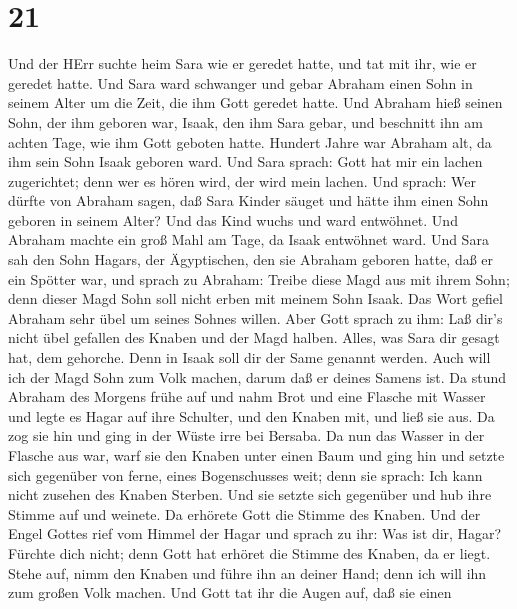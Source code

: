 \hypertarget{section-20}{%
\section{21}\label{section-20}}

 Und der HErr suchte heim Sara wie er geredet hatte, und tat
mit ihr, wie er geredet hatte.  Und Sara ward schwanger und
gebar Abraham einen Sohn in seinem Alter um die Zeit, die ihm Gott
geredet hatte.  Und Abraham hieß seinen Sohn, der ihm
geboren war, Isaak, den ihm Sara gebar,  und beschnitt ihn
am achten Tage, wie ihm Gott geboten hatte.  Hundert Jahre
war Abraham alt, da ihm sein Sohn Isaak geboren ward.  Und
Sara sprach: Gott hat mir ein lachen zugerichtet; denn wer es hören
wird, der wird mein lachen.  Und sprach: Wer dürfte von
Abraham sagen, daß Sara Kinder säuget und hätte ihm einen Sohn geboren
in seinem Alter?  Und das Kind wuchs und ward entwöhnet. Und
Abraham machte ein groß Mahl am Tage, da Isaak entwöhnet ward.
 Und Sara sah den Sohn Hagars, der Ägyptischen, den sie
Abraham geboren hatte, daß er ein Spötter war,  und sprach
zu Abraham: Treibe diese Magd aus mit ihrem Sohn; denn dieser Magd Sohn
soll nicht erben mit meinem Sohn Isaak.  Das Wort gefiel
Abraham sehr übel um seines Sohnes willen.  Aber Gott
sprach zu ihm: Laß dir's nicht übel gefallen des Knaben und der Magd
halben. Alles, was Sara dir gesagt hat, dem gehorche. Denn in Isaak soll
dir der Same genannt werden.  Auch will ich der Magd Sohn
zum Volk machen, darum daß er deines Samens ist.  Da stund
Abraham des Morgens frühe auf und nahm Brot und eine Flasche mit Wasser
und legte es Hagar auf ihre Schulter, und den Knaben mit, und ließ sie
aus. Da zog sie hin und ging in der Wüste irre bei Bersaba.
 Da nun das Wasser in der Flasche aus war, warf sie den
Knaben unter einen Baum  und ging hin und setzte sich
gegenüber von ferne, eines Bogenschusses weit; denn sie sprach: Ich kann
nicht zusehen des Knaben Sterben. Und sie setzte sich gegenüber und hub
ihre Stimme auf und weinete.  Da erhörete Gott die Stimme
des Knaben. Und der Engel Gottes rief vom Himmel der Hagar und sprach zu
ihr: Was ist dir, Hagar? Fürchte dich nicht; denn Gott hat erhöret die
Stimme des Knaben, da er liegt.  Stehe auf, nimm den Knaben
und führe ihn an deiner Hand; denn ich will ihn zum großen Volk machen.
 Und Gott tat ihr die Augen auf, daß sie einen
